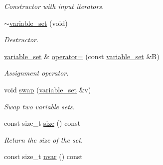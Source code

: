 \begin{DoxyCompactItemize}
\begin{DoxyCompactList}\small\item\em Constructor with input iterators. \end{DoxyCompactList}\item 
\hypertarget{classmerlin_1_1variable__set_a13807826d3d4b0c175bda457287f1e52}{}\hyperlink{classmerlin_1_1variable__set_a13807826d3d4b0c175bda457287f1e52}{$\sim$variable\+\_\+set} (void)\label{classmerlin_1_1variable__set_a13807826d3d4b0c175bda457287f1e52}

\begin{DoxyCompactList}\small\item\em Destructor. \end{DoxyCompactList}\item 
\hypertarget{classmerlin_1_1variable__set_a5f36dc1ce299f11257f629b35b8a3906}{}\hyperlink{classmerlin_1_1variable__set}{variable\+\_\+set} \& \hyperlink{classmerlin_1_1variable__set_a5f36dc1ce299f11257f629b35b8a3906}{operator=} (const \hyperlink{classmerlin_1_1variable__set}{variable\+\_\+set} \&B)\label{classmerlin_1_1variable__set_a5f36dc1ce299f11257f629b35b8a3906}

\begin{DoxyCompactList}\small\item\em Assignment operator. \end{DoxyCompactList}\item 
\hypertarget{classmerlin_1_1variable__set_af22f5cc1ecd470d78e74dbe4ec34014e}{}void \hyperlink{classmerlin_1_1variable__set_af22f5cc1ecd470d78e74dbe4ec34014e}{swap} (\hyperlink{classmerlin_1_1variable__set}{variable\+\_\+set} \&v)\label{classmerlin_1_1variable__set_af22f5cc1ecd470d78e74dbe4ec34014e}

\begin{DoxyCompactList}\small\item\em Swap two variable sets. \end{DoxyCompactList}\item 
\hypertarget{classmerlin_1_1variable__set_aa73f5eb2ec21a678121254234d92ca9c}{}const size\+\_\+t \hyperlink{classmerlin_1_1variable__set_aa73f5eb2ec21a678121254234d92ca9c}{size} () const \label{classmerlin_1_1variable__set_aa73f5eb2ec21a678121254234d92ca9c}

\begin{DoxyCompactList}\small\item\em Return the size of the set. \end{DoxyCompactList}\item 
\hypertarget{classmerlin_1_1variable__set_a738c52ab39d0746a6fb71d558564f00e}{}const size\+\_\+t \hyperlink{classmerlin_1_1variable__set_a738c52ab39d0746a6fb71d558564f00e}{nvar} () const \label{classmerlin_1_1variable__set_a738c52ab39d0746a6fb71d558564f00e}


\end{DoxyCompactItemize}
